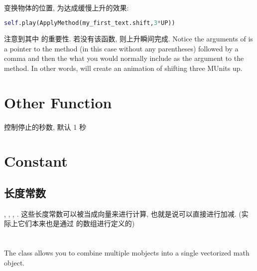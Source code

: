         \paragraph{ \\}
            \hspace*{2em}变换物体的位置, 为达成缓慢上升的效果:
                \begin{lstlisting}[language = {Python}, gobble = 20]
                    self.play(ApplyMethod(my_first_text.shift,3*UP))
                \end{lstlisting}
            注意到其中  的重要性. 若没有该函数, 则上升瞬间完成. Notice the arguments of  is a pointer to the method (in this case  without any parentheses) followed by a comma and then the what you would normally include as the argument to the  method. In other words,  will create an animation of shifting  three MUnits up.

\section{Other Function}
    \paragraph{}
        控制停止的秒数, 默认 1 秒

\section{Constant}
    \subsection{长度常数}
        , , , . 这些长度常数可以被当成向量来进行计算, 也就是说可以直接进行加减. (实际上它们本来也是通过  的数组进行定义的)

\section{}
    \hspace*{2em}The  class allows you to combine multiple mobjects into a single vectorized math object.
